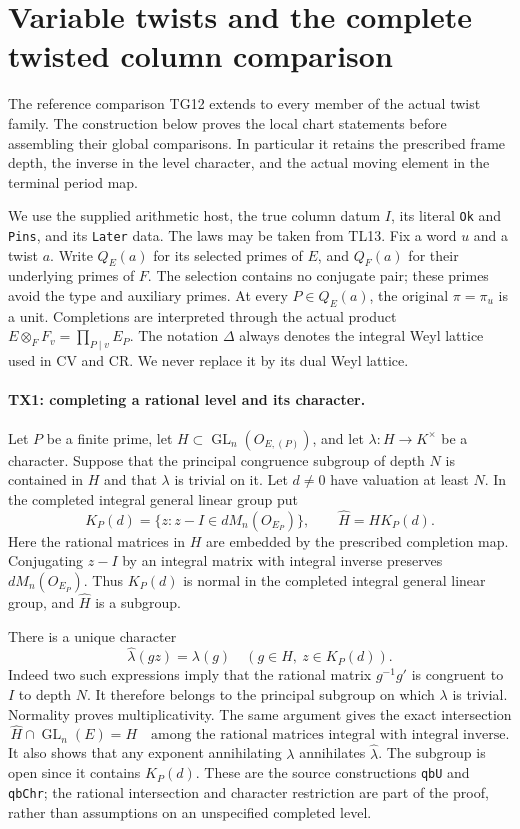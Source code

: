 \section{Variable twists and the complete twisted column comparison}
\label{sec:twisted-comparison}

The reference comparison TG12 extends to every member of the actual
twist family. The construction below proves the local chart statements
before assembling their global comparisons. In particular it retains
the prescribed frame depth, the inverse in the level character, and the
actual moving element in the terminal period map.

We use the supplied arithmetic host, the true column datum \(I\), its
literal \texttt{Ok} and \texttt{Pins}, and its \texttt{Later} data.
The laws may be taken from TL13. Fix a word \(u\) and a twist \(a\).
Write \(Q_E(a)\) for its selected primes of \(E\), and \(Q_F(a)\)
for their underlying primes of \(F\). The selection contains no conjugate
pair; these primes avoid the type and auxiliary primes. At every
\(P\in Q_E(a)\), the original \(\pi=\pi_u\) is a unit.
Completions are interpreted through the actual product
\(E\otimes_F F_v=\prod_{P\mid v}E_P\).
The notation \(\Delta\) always denotes the integral Weyl lattice used
in CV and CR. We never replace it by its dual Weyl lattice.

\paragraph{TX1: completing a rational level and its character.}
Let \(P\) be a finite prime, let \(H\subset\operatorname{GL}_n(O_{E,(P)})\),
and let \(\lambda:H\to K^\times\) be a character. Suppose that the
principal congruence subgroup of depth \(N\) is contained in \(H\)
and that \(\lambda\) is trivial on it. Let \(d\ne0\) have valuation at
least \(N\). In the completed integral general linear group put
\[
 K_P(d)=\{z:z-I\in dM_n(O_{E_P})\},\qquad
 \widehat H=H K_P(d).
\]
Here the rational matrices in \(H\) are embedded by the prescribed
completion map. Conjugating \(z-I\) by an integral matrix with integral
inverse preserves \(dM_n(O_{E_P})\). Thus \(K_P(d)\) is normal in
the completed integral general linear group, and \(\widehat H\)
is a subgroup.

There is a unique character
\[
 \widehat\lambda(gz)=\lambda(g)\quad(g\in H,\ z\in K_P(d)).
 \tag{TX1.1}
\]
Indeed two such expressions imply that the rational matrix
\(g^{-1}g'\) is congruent to \(I\) to depth \(N\). It therefore
belongs to the principal subgroup on which \(\lambda\) is trivial.
Normality proves multiplicativity. The same argument gives the exact
intersection
\[
 \widehat H\cap\operatorname{GL}_n(E)=H
 \quad\text{among the rational matrices integral with integral inverse.}
 \tag{TX1.2}
\]
It also shows that any exponent annihilating \(\lambda\) annihilates
\(\widehat\lambda\). The subgroup is open since it contains \(K_P(d)\).
These are the source constructions \texttt{qbU} and \texttt{qbChr};
the rational intersection and character restriction are part of the
proof, rather than assumptions on an unspecified completed level.

